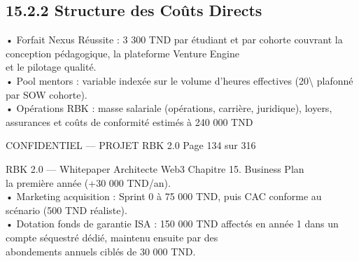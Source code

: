 \documentclass[12pt,landscape,a4paper]{article}
\newenvironment{confidential}
{\begin{tcolorbox}[
    colback=rbkred!5!white,
    colframe=rbkred!75!black,
    title=CONFIDENTIEL,
    fonttitle=\bfseries\color{white},
    coltitle=rbkred!75!black,
    breakable,
    enhanced,
    frame hidden,
    borderline west={2pt}{0pt}{rbkred!75!black}
]}
{\end{tcolorbox}}
\begin{document}
\subsection{15.2.2 Structure des Coûts Directs}
• Forfait Nexus Réussite : 3 300 TND par étudiant et par cohorte couvrant la conception pédagogique, la plateforme Venture Engine\\
et le pilotage qualité.\\
\vspace{0.5em}
• Pool mentors : variable indexée sur le volume d’heures effectives (20\textbackslash{}%
plafonné par SOW cohorte).\\
\vspace{0.5em}
• Opérations RBK : masse salariale (opérations, carrière, juridique), loyers, assurances et coûts de conformité estimés à 240 000 TND\\
\vspace{0.5em}
\vspace{0.5em}
\begin{confidential}CONFIDENTIEL — PROJET RBK 2.0                                   Page 134 sur 316\end{confidential}
RBK 2.0 — Whitepaper Architecte Web3                                                                                           Chapitre 15. Business Plan\\
\vspace{0.5em}
\vspace{0.5em}
la première année (+30 000 TND/an).\\
\vspace{0.5em}
• Marketing acquisition : Sprint 0 à 75 000 TND, puis CAC conforme au scénario (500 TND réaliste).\\
\vspace{0.5em}
• Dotation fonds de garantie ISA : 150 000 TND affectés en année 1 dans un compte séquestré dédié, maintenu ensuite par des\\
abondements annuels ciblés de 30 000 TND.\\
\vspace{0.5em}
\vspace{0.5em}
\end{document}
